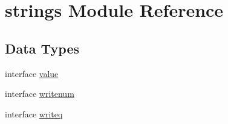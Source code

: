 \hypertarget{namespacestrings}{}\section{strings Module Reference}
\label{namespacestrings}
\subsection*{Data Types}
\begin{DoxyCompactItemize}
\item 
interface \hyperlink{interfacestrings_1_1value}{value}
\item 
interface \hyperlink{interfacestrings_1_1writenum}{writenum}
\item 
interface \hyperlink{interfacestrings_1_1writeq}{writeq}
\end{DoxyCompactItemize}
